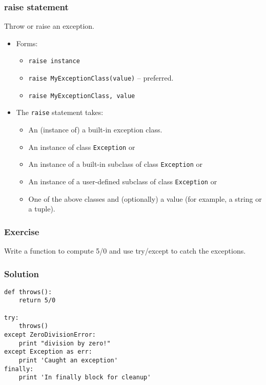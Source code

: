 \begin{frame}[fragile]\frametitle{raise statement}
Throw or raise an exception.
\begin{itemize}
\item Forms:
	\begin{itemize}
	\item \lstinline{raise instance}
	\item \lstinline{raise MyExceptionClass(value)}  -- preferred.
	\item \lstinline{raise MyExceptionClass, value}
	\end{itemize}
\item The  \lstinline{raise}  statement takes:
	\begin{itemize}
	\item An (instance of) a built-in exception class.
	\item An instance of class   \lstinline{Exception}  or
	\item An instance of a built-in subclass of class   \lstinline{Exception}  or
	\item An instance of a user-defined subclass of class   \lstinline{Exception}  or
	\item One of the above classes and (optionally) a value (for example, a string or a tuple).
	\end{itemize}
\end{itemize}
\end{frame}



\begin{frame}[fragile]\frametitle{Exercise}
Write a function to compute 5/0 and use try/except to catch the exceptions.
\end{frame}

\begin{frame}[fragile]\frametitle{Solution}
\begin{lstlisting}
def throws():
    return 5/0

try:
    throws()
except ZeroDivisionError:
    print "division by zero!"
except Exception as err:
    print 'Caught an exception'
finally:
    print 'In finally block for cleanup'
\end{lstlisting}
\end{frame}



